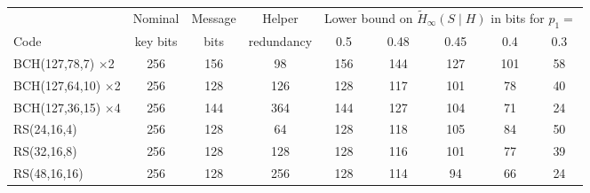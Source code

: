 \begin{tabular}{lcccccccc}
\toprule
 & Nominal & Message & Helper & \multicolumn{5}{c}{Lower bound on $\tilde{H}_\infty(S\mid H)$ in bits for $p_1=$} \\
Code & key bits & bits & redundancy & 0.5 & 0.48 & 0.45 & 0.4 & 0.3 \\
\midrule
BCH(127,78,7) $\times$2 & 256 & 156 & 98 & 156 & 144 & 127 & 101 & 58 \\
BCH(127,64,10) $\times$2 & 256 & 128 & 126 & 128 & 117 & 101 & 78 & 40 \\
BCH(127,36,15) $\times$4 & 256 & 144 & 364 & 144 & 127 & 104 & 71 & 24 \\
RS(24,16,4) & 256 & 128 & 64 & 128 & 118 & 105 & 84 & 50 \\
RS(32,16,8) & 256 & 128 & 128 & 128 & 116 & 101 & 77 & 39 \\
RS(48,16,16) & 256 & 128 & 256 & 128 & 114 & 94 & 66 & 24 \\
\bottomrule
\end{tabular}
